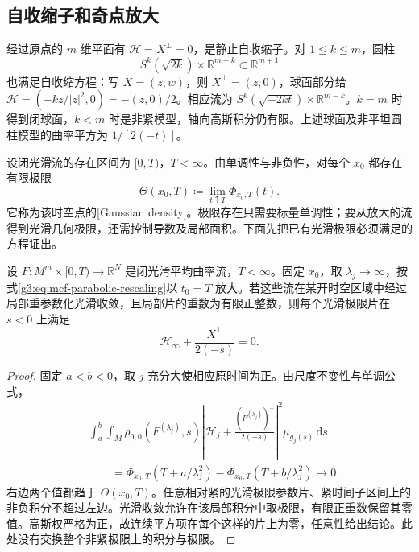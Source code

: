 \subsection{自收缩子和奇点放大}
\label{g3:subsec:2803:04}
\begin{example}\label{g3:exm:mcf-shrinker-models}
	经过原点的 \(m\) 维平面有 \(\mathcal H=X^\perp=0\)，是静止自收缩子。对 \(1\le k\le m\)，圆柱
	\[
		S^k(\sqrt{2k})\times\mathbb R^{m-k}\subset\mathbb R^{m+1}
	\]
	也满足自收缩方程：写 \(X=(z,w)\)，则 \(X^\perp=(z,0)\)，球面部分给 \(\mathcal H=(-kz/|z|^2,0)=-(z,0)/2\)。相应流为 \(S^k(\sqrt{-2kt})\times\mathbb R^{m-k}\)。\(k=m\) 时得到闭球面，\(k<m\) 时是非紧模型，轴向高斯积分仍有限。上述球面及非平坦圆柱模型的曲率平方为 \(1/[2(-t)]\)。
\end{example}

设闭光滑流的存在区间为 \([0,T)\)，\(T<\infty\)。由单调性与非负性，对每个 \(x_0\) 都存在有限极限
\begin{equation}\label{g3:eq:mcf-gaussian-density}
	\Theta(x_0,T)\coloneqq\lim_{t\uparrow T}\Phi_{x_0,T}(t).
\end{equation}
它称为该时空点的[Gaussian density]。极限存在只需要标量单调性；要从放大的流得到光滑几何极限，还需控制导数及局部面积。下面先把已有光滑极限必须满足的方程证出。

\begin{proposition}\label{g3:prop:mcf-smooth-blowup-shrinker}
	设 \(F:M^m\times[0,T)\to\mathbb R^N\) 是闭光滑平均曲率流，\(T<\infty\)。固定 \(x_0\)，取 \(\lambda_j\to\infty\)，按式\eqref{g3:eq:mcf-parabolic-rescaling}以 \(t_0=T\) 放大。若这些流在某开时空区域中经过局部重参数化光滑收敛，且局部片的重数为有限正整数，则每个光滑极限片在 \(s<0\) 上满足
	\[
		\mathcal H_\infty+\frac{X^\perp}{2(-s)}=0.
	\]
\end{proposition}
\begin{proof}
	固定 \(a<b<0\)，取 \(j\) 充分大使相应原时间为正。由尺度不变性与单调公式，
	\begin{align*}
		&\int_a^b\int_M\rho_{0,0}(F^{(\lambda_j)},s)
		\left|\mathcal H_j+\frac{(F^{(\lambda_j)})^\perp}{2(-s)}\right|^2
		\mu_{g_j(s)}\,\mathrm ds\\
		&\qquad=\Phi_{x_0,T}(T+a/\lambda_j^2)
		-\Phi_{x_0,T}(T+b/\lambda_j^2)\longrightarrow0.
	\end{align*}
	右边两个值都趋于 \(\Theta(x_0,T)\)。任意相对紧的光滑极限参数片、紧时间子区间上的非负积分不超过左边。光滑收敛允许在该局部积分中取极限，有限正重数保留其零值。高斯权严格为正，故连续平方项在每个这样的片上为零，任意性给出结论。此处没有交换整个非紧极限上的积分与极限。
\end{proof}

